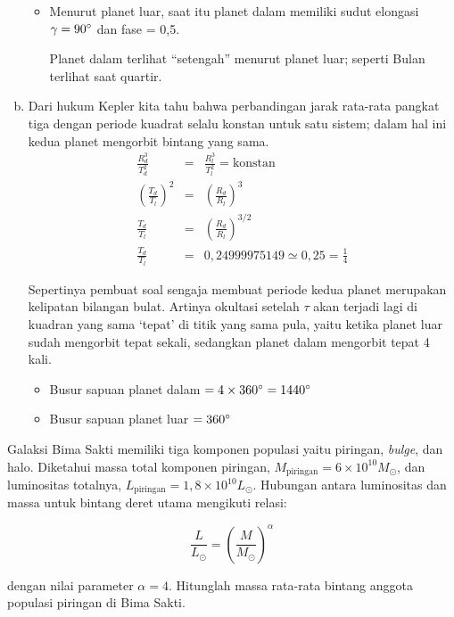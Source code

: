\documentclass[11pt,fleqn]{exam}
\begin{document}
\begin{questions}
\begin{enumerate}[a)]
\begin{itemize}
\item Menurut planet luar, saat itu planet dalam memiliki sudut elongasi $\gamma = 90\degree$ dan fase = 0,5. 

Planet dalam terlihat ``setengah'' menurut planet luar; seperti Bulan terlihat saat quartir.
\end{itemize}

\item Dari hukum Kepler kita tahu bahwa perbandingan jarak rata-rata pangkat tiga dengan periode kuadrat selalu konstan untuk satu sistem; dalam hal ini kedua planet mengorbit bintang yang sama.
\begin{eqnarray*}
\frac{R_d^3}{T_d^2} &=& \frac{R_l^3}{T_l^2} = \text{konstan} \\
\left(\frac{T_d}{T_l}\right)^2 &=& \left(\frac{R_d}{R_l}\right)^3 \\
\frac{T_d}{T_l} &=& \left(\frac{R_d}{R_l}\right)^{3/2} \\
\frac{T_d}{T_l} &=& 0,24999975149 \simeq 0,25 = \frac{1}{4}
\end{eqnarray*}

Sepertinya pembuat soal sengaja membuat periode kedua planet merupakan kelipatan bilangan bulat. Artinya okultasi setelah $\tau$ akan terjadi lagi di kuadran yang sama `tepat' di titik yang sama pula, yaitu ketika planet luar sudah mengorbit tepat sekali, sedangkan planet dalam mengorbit tepat 4 kali. 
\begin{itemize}
\item Busur sapuan planet dalam $= 4 \times 360\degree = 1440\degree$
\item Busur sapuan planet luar $= 360\degree$
\end{itemize}


\end{enumerate}


\vspace{0.3cm}
\question Galaksi Bima Sakti memiliki tiga komponen populasi yaitu piringan, \textit{bulge}, dan halo. Diketahui massa total komponen piringan, $M_{\text{piringan}}= 6\times 10^{10} M_{\odot}$, dan luminositas totalnya, $L_{\text{piringan}}= 1,8\times 10^{10} L_{\odot}$. Hubungan antara luminositas dan massa untuk bintang deret utama mengikuti relasi:

$$\frac{L}{L_{\odot}} = \left( \frac{M}{M_{\odot}}\right)^\alpha$$

dengan nilai parameter $\alpha=4$. Hitunglah massa rata-rata bintang anggota populasi piringan di Bima Sakti.\\



\end{questions}
\end{document}
